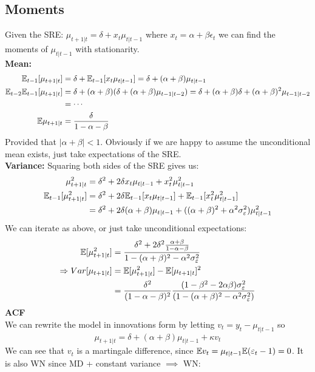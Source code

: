 \documentclass[DIV=14,titlepage=false]{scrreprt}
\begin{document}
\subsection{Moments}
Given the SRE: $\mu_{t+1|t} = \delta + x_t \mu_{t|t-1}$ where $x_t = \alpha+\beta \epsilon_t$ we can find the moments of $\mu_{t|t-1}$ with stationarity.\\
\textbf{Mean:}
\begin{align*}
    \mathbb{E}_{t-1}[\mu_{t+1|t}] &= \delta + \mathbb{E}_{t-1}[x_t \mu_{t|t-1}]= \delta + (\alpha + \beta) \mu_{t|t-1}\\
    \mathbb{E}_{t-2} \mathbb{E}_{t-1}[\mu_{t+1|t}] &= \delta + (\alpha + \beta) (\delta + (\alpha + \beta) \mu_{t-1|t-2}) = \delta + (\alpha + \beta) \delta + (\alpha + \beta)^2 \mu_{t-1|t-2}\\
    &= \cdots\\
    \mathbb{E} \mu_{t+1|t} &= \frac{\delta}{1 - \alpha - \beta}
\end{align*}
Provided that $|\alpha + \beta| < 1$. Obviously if we are happy to assume the unconditional mean exists, just take expectations of the SRE.\\
\textbf{Variance:}
Squaring both sides of the SRE gives us:
\begin{align*}
    \mu_{t+1|t}^2 &= \delta^2 + 2\delta x_t \mu_{t|t-1} + x_t^2 \mu_{t|t-1}^2\\
    \mathbb{E}_{t-1}[\mu_{t+1|t}^2] &= \delta^2 + 2\delta \mathbb{E}_{t-1}[x_t \mu_{t|t-1}] + \mathbb{E}_{t-1}[x_t^2 \mu_{t|t-1}^2]\\
    &= \delta^2 + 2\delta (\alpha + \beta) \mu_{t|t-1} + ((\alpha+\beta)^2 + \alpha^2 \sigma^2_\varepsilon) \mu_{t|t-1}^2
\end{align*}
We can iterate as above, or just take unconditional expectations:
\begin{align*}
    \mathbb{E}[\mu_{t+1|t}^2] &= \frac{\delta^2 + 2\delta^2 \frac{\alpha + \beta}{1 - \alpha - \beta}}{1 - (\alpha + \beta)^2 - \alpha^2 \sigma^2_\varepsilon}\\
    \Rightarrow Var[\mu_{t+1|t}] &= \mathbb{E}[\mu_{t+1|t}^2] - \mathbb{E}[\mu_{t+1|t}]^2\\
    &= \frac{\delta^2}{(1 - \alpha - \beta)^2} \frac{(1-\beta^2-2\alpha\beta)\sigma^2_\varepsilon}{(1 - (\alpha + \beta)^2 - \alpha^2 \sigma^2_\varepsilon)}
\end{align*}
\textbf{ACF}\\
We can rewrite the model in innovations form by letting $v_t = y_t-\mu_{t|t-1}$ so
\[
    \mu_{t+1|t} = \delta + (\alpha+\beta)\mu_{t|t-1} +\kappa v_t
\]
We can see that $v_t$ is a martingale difference, since $\mathbb{E} v_t = \mu_{t|t-1}\mathbb{E}(\varepsilon_t -1)=0$. It is also WN since MD + constant variance $\implies$ WN:
\end{document}
